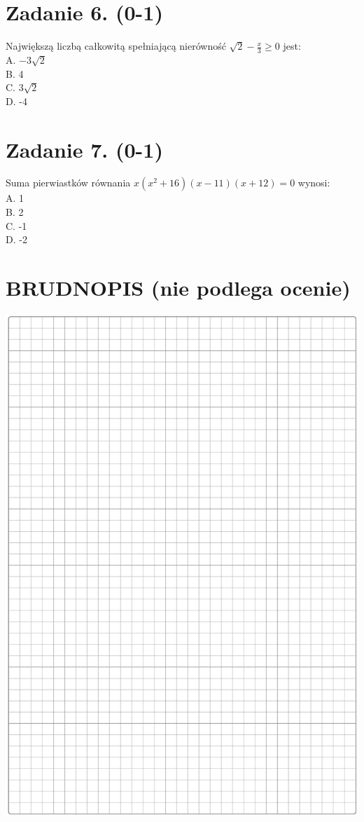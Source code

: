 \documentclass[10pt]{article}
\begin{document}
\section*{Zadanie 6. (0-1)}
Największą liczbą całkowitą spełniającą nierówność \(\sqrt{2}-\frac{x}{3} \geq 0\) jest:\\
A. \(-3 \sqrt{2}\)\\
B. 4\\
C. \(3 \sqrt{2}\)\\
D. -4

\section*{Zadanie 7. (0-1)}
Suma pierwiastków równania \(x\left(x^{2}+16\right)(x-11)(x+12)=0\) wynosi:\\
A. 1\\
B. 2\\
C. -1\\
D. -2

\section*{BRUDNOPIS (nie podlega ocenie)}
\begin{center}
\includegraphics[max width=\textwidth]{2024_11_21_cdea326d19d0c2132b88g-03}
\end{center}
\end{document}
